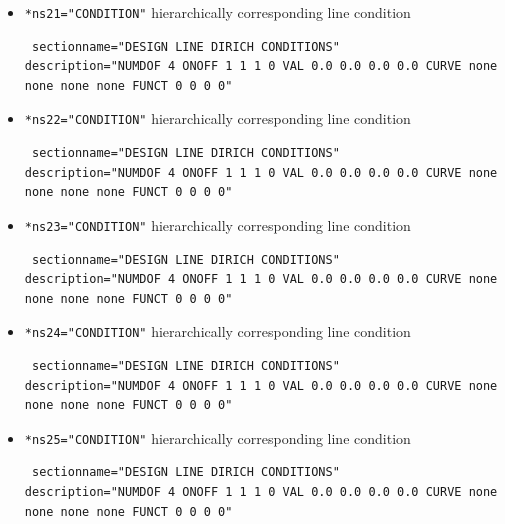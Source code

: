 \begin{itemize}
 \item \verb|*ns21="CONDITION"| \qquad hierarchically corresponding line condition
\begin{small} \begin{verbatim} sectionname="DESIGN LINE DIRICH CONDITIONS"
description="NUMDOF 4 ONOFF 1 1 1 0 VAL 0.0 0.0 0.0 0.0 CURVE none none none none FUNCT 0 0 0 0"
\end{verbatim} \end{small}

 \item \verb|*ns22="CONDITION"| \qquad hierarchically corresponding line condition
\begin{small} \begin{verbatim} sectionname="DESIGN LINE DIRICH CONDITIONS"
description="NUMDOF 4 ONOFF 1 1 1 0 VAL 0.0 0.0 0.0 0.0 CURVE none none none none FUNCT 0 0 0 0"
\end{verbatim} \end{small}

 \item \verb|*ns23="CONDITION"| \qquad hierarchically corresponding line condition
\begin{small} \begin{verbatim} sectionname="DESIGN LINE DIRICH CONDITIONS"
description="NUMDOF 4 ONOFF 1 1 1 0 VAL 0.0 0.0 0.0 0.0 CURVE none none none none FUNCT 0 0 0 0"
\end{verbatim} \end{small}

\item \verb|*ns24="CONDITION"| \qquad hierarchically corresponding line condition
\begin{small} \begin{verbatim} sectionname="DESIGN LINE DIRICH CONDITIONS"
description="NUMDOF 4 ONOFF 1 1 1 0 VAL 0.0 0.0 0.0 0.0 CURVE none none none none FUNCT 0 0 0 0"
\end{verbatim} \end{small}

 \item \verb|*ns25="CONDITION"| \qquad hierarchically corresponding line condition
\begin{small} \begin{verbatim} sectionname="DESIGN LINE DIRICH CONDITIONS"
description="NUMDOF 4 ONOFF 1 1 1 0 VAL 0.0 0.0 0.0 0.0 CURVE none none none none FUNCT 0 0 0 0"
\end{verbatim} \end{small}


\end{itemize}
